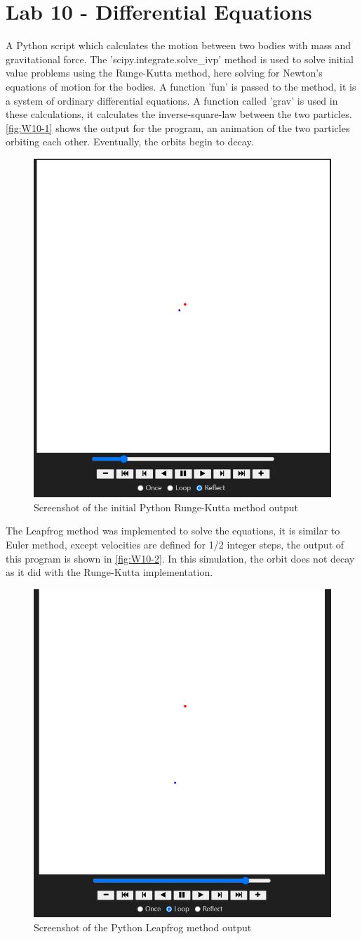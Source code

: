 \newpage
\section{Lab 10 - Differential Equations}
A Python script which calculates the motion between two bodies with mass and gravitational force. The 'scipy.integrate.solve{\_}ivp' method is used to solve initial value problems using the Runge-Kutta method, here solving for Newton's equations of motion for the bodies. A function 'fun' is passed to the method, it is a system of ordinary differential equations. A function called 'grav' is used in these calculations, it calculates the inverse-square-law between the two particles. \autoref{fig:W10-1} shows the output for the program, an animation of the two particles orbiting each other. Eventually, the orbits begin to decay.

\begin{figure}[H] 
    \centering
    \includegraphics[width=0.49\columnwidth]{Figures/Week 10/1.png}
    \caption{Screenshot of the initial Python Runge-Kutta method output}
    \label{fig:W10-1}
\end{figure}

The Leapfrog method was implemented to solve the equations, it is similar to Euler method, except velocities are defined for 1/2 integer steps, the output of this program is shown in \autoref{fig:W10-2}. In this simulation, the orbit does not decay as it did with the Runge-Kutta implementation.
\begin{figure}[H] 
    \centering
    \includegraphics[width=0.49\columnwidth]{Figures/Week 10/2.png}
    \caption{Screenshot of the Python Leapfrog method output}
    \label{fig:W10-2}
\end{figure}

